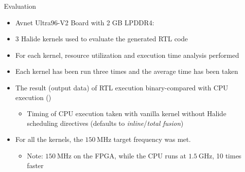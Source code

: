 \documentclass[8pt,a4paper,oneside,hidelinks,aspectratio=169,dvipsnames]{beamer}
\begin{document}
\begin{frame}{Evaluation}
  \begin{itemize}
    \item Avnet Ultra96-V2 Board with 2 GB LPDDR4:
          \begin{table}[H]
            \centering
            \scalebox{.5}{}
            \scalebox{.5}{}
          \end{table}
    \item 3 Halide kernels used to evaluate the generated RTL code
    \item For each kernel, resource utilization and execution time analysis performed
    \item Each kernel has been run three times and the average time has been taken
    \item The result (output data) of RTL execution binary-compared with CPU execution ()
          \begin{itemize}
            \item Timing of CPU execution taken with vanilla kernel without Halide scheduling directives (defaults to \textit{inline}/\textit{total fusion})
          \end{itemize}
    \item For all the kernels, the ${\SI{150}{\mega\hertz}}$ target frequency was met.
          \begin{itemize}
            \item Note: ${\SI{150}{\mega\hertz}}$ on the FPGA, while the CPU runs at ${\SI{1.5}{\giga\hertz}}$, 10 times faster
          \end{itemize}
  \end{itemize}

\end{frame}
\end{document}
